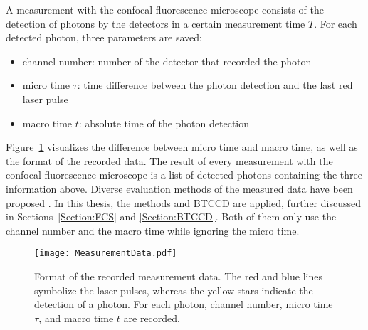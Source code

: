A measurement with the confocal fluorescence microscope consists of the detection of photons by the detectors in a certain measurement time $T$. For each detected photon, three parameters are saved:
\begin{itemize}
	\item channel number: number of the detector that recorded the photon
	\item micro time $\tau$: time difference between the photon detection and the last red laser pulse 
	\item macro time $t$: absolute time of the photon detection
\end{itemize}
Figure~\ref{fig:MeasurementData} visualizes the difference between micro time and macro time, as well as the format of the recorded data. The result of every measurement with the confocal fluorescence microscope is a list of detected photons containing the three information above. Diverse evaluation methods of the measured data have been proposed \cite{Wahl}. In this thesis, the methods  and \gls{BTCCD} are applied, further discussed in Sections~\ref{Section:FCS} and \ref{Section:BTCCD}. Both of them only use the channel number and the macro time while ignoring the micro time.

\begin{figure}[h!]
	\centering
	\texttt{[image: MeasurementData.pdf]}
	\caption[Format of recorded measurement data]{Format of the recorded measurement data. The red and blue lines symbolize the laser pulses, whereas the yellow stars indicate the detection of a photon. For each photon, channel number, micro time $\tau$, and macro time $t$ are recorded.}
	\label{fig:MeasurementData}
\end{figure}